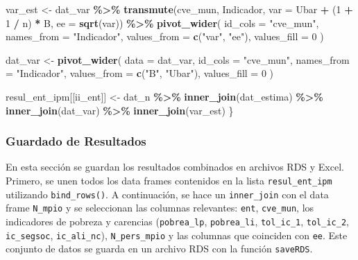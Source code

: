 \documentclass[
  12pt,
]{book}
\newenvironment{Shaded}{\begin{snugshade}}{\end{snugshade}}
\newcommand{\AttributeTok}[1]{\textcolor[rgb]{0.13,0.29,0.53}{#1}}
\newcommand{\DecValTok}[1]{\textcolor[rgb]{0.00,0.00,0.81}{#1}}
\newcommand{\FunctionTok}[1]{\textcolor[rgb]{0.13,0.29,0.53}{\textbf{#1}}}
\newcommand{\NormalTok}[1]{#1}
\newcommand{\OtherTok}[1]{\textcolor[rgb]{0.56,0.35,0.01}{#1}}
\newcommand{\SpecialCharTok}[1]{\textcolor[rgb]{0.81,0.36,0.00}{\textbf{#1}}}
\newcommand{\StringTok}[1]{\textcolor[rgb]{0.31,0.60,0.02}{#1}}
\begin{document}
\begin{Shaded}
\begin{Highlighting}[]
\NormalTok{  var\_est }\OtherTok{\textless{}{-}}
\NormalTok{    dat\_var }\SpecialCharTok{\%\textgreater{}\%} \FunctionTok{transmute}\NormalTok{(cve\_mun,}
\NormalTok{                          Indicador,}
                          \AttributeTok{var =}\NormalTok{ Ubar }\SpecialCharTok{+}\NormalTok{ (}\DecValTok{1} \SpecialCharTok{+} \DecValTok{1} \SpecialCharTok{/}\NormalTok{ n) }\SpecialCharTok{*}\NormalTok{ B,}
                          \AttributeTok{ee =} \FunctionTok{sqrt}\NormalTok{(var)) }\SpecialCharTok{\%\textgreater{}\%}
    \FunctionTok{pivot\_wider}\NormalTok{(}
      \AttributeTok{id\_cols =} \StringTok{"cve\_mun"}\NormalTok{,}
      \AttributeTok{names\_from =} \StringTok{"Indicador"}\NormalTok{,}
      \AttributeTok{values\_from =} \FunctionTok{c}\NormalTok{(}\StringTok{"var"}\NormalTok{, }\StringTok{"ee"}\NormalTok{),}
      \AttributeTok{values\_fill =} \DecValTok{0}
\NormalTok{    )}
  
\NormalTok{  dat\_var }\OtherTok{\textless{}{-}}
    \FunctionTok{pivot\_wider}\NormalTok{(}
      \AttributeTok{data =}\NormalTok{ dat\_var,}
      \AttributeTok{id\_cols =} \StringTok{"cve\_mun"}\NormalTok{,}
      \AttributeTok{names\_from =} \StringTok{"Indicador"}\NormalTok{,}
      \AttributeTok{values\_from =} \FunctionTok{c}\NormalTok{(}\StringTok{"B"}\NormalTok{, }\StringTok{"Ubar"}\NormalTok{),}
      \AttributeTok{values\_fill =} \DecValTok{0}
\NormalTok{    )}
  
\NormalTok{resul\_ent\_ipm[[ii\_ent]] }\OtherTok{\textless{}{-}}
\NormalTok{    dat\_n }\SpecialCharTok{\%\textgreater{}\%} \FunctionTok{inner\_join}\NormalTok{(dat\_estima) }\SpecialCharTok{\%\textgreater{}\%} \FunctionTok{inner\_join}\NormalTok{(dat\_var) }\SpecialCharTok{\%\textgreater{}\%} \FunctionTok{inner\_join}\NormalTok{(var\_est)}
\NormalTok{\}}
\end{Highlighting}
\end{Shaded}

\hypertarget{guardado-de-resultados}{%
\subsubsection*{Guardado de Resultados}\label{guardado-de-resultados}}

En esta sección se guardan los resultados combinados en archivos RDS y Excel. Primero, se unen todos los data frames contenidos en la lista \texttt{resul\_ent\_ipm} utilizando \texttt{bind\_rows()}. A continuación, se hace un \texttt{inner\_join} con el data frame \texttt{N\_mpio} y se seleccionan las columnas relevantes: \texttt{ent}, \texttt{cve\_mun}, los indicadores de pobreza y carencias (\texttt{pobrea\_lp}, \texttt{pobrea\_li}, \texttt{tol\_ic\_1}, \texttt{tol\_ic\_2}, \texttt{ic\_segsoc}, \texttt{ic\_ali\_nc}), \texttt{N\_pers\_mpio} y las columnas que coinciden con \texttt{ee}. Este conjunto de datos se guarda en un archivo RDS con la función \texttt{saveRDS}.
\end{document}
